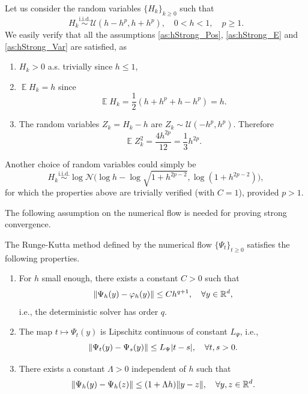 \documentclass{siamart1116}
\numberwithin{theorem}{section}
\DeclarePairedDelimiter{\abs}{\lvert}{\rvert}
\DeclarePairedDelimiter{\norm}{\|}{\|}
\renewcommand{\phi}{\varphi}
\newcommand{\iid}{\ensuremath{\stackrel{\text{i.i.d.}}{\sim}}}
\newcommand{\R}{\mathbb{R}}
\newcommand{\E}{\operatorname{\mathbb{E}}}
\newcommand{\corr}[1]{{\color{bordeaux}#1}}
\begin{document}
\begin{example}\label{ex:uniformH} Let us consider the random variables $\{H_k\}_{k\geq 0}$ such that
	\begin{equation}
		H_k \iid \mathcal{U}(h-h^p, h+h^p), \quad 0 < h < 1, \quad p \geq 1.
	\end{equation}
	We easily verify that all the assumptions \ref{as:hStrong_Pos}, \ref{as:hStrong_E} and \ref{as:hStrong_Var} are satisfied, as 
	\begin{enumerate}
		\item $H_k > 0$ a.s. trivially since $h \leq 1$,
		\item $\E H_k = h$ since 
		\begin{equation}
			\E H_k = \frac{1}{2}(h + h^p + h - h^p) = h.
		\end{equation}
		\item The random variables $Z_k = H_k - h$ are $Z_k \sim \mathcal{U}(-h^p, h^p)$. Therefore
		\begin{equation}
			\E Z_k^2 = \frac{4h^{2p}}{12} = \frac{1}{3}h^{2p}.
		\end{equation}
	\end{enumerate}
	Another choice of random variables could simply be 
	\begin{equation}
		H_k \iid \log\mathcal{N}\big(\log h - \log\sqrt{1 + h^{2p - 2}}, \log(1 + h^{2p-2})\big),
	\end{equation}
	for which the properties above are trivially verified (with $C = 1$), provided $p > 1$.
\end{example}
The following assumption on the numerical flow is needed for proving strong convergence.
\begin{assumption}\label{as:PsiStrong} The Runge-Kutta method defined by the numerical flow $\{\Psi_t\}_{t\geq 0}$ satisfies the following properties.
	\begin{enumerate}
		\item\label{as:PsiStrong_Order} For $h$ small enough, there exists a constant $C > 0$ such that
			\begin{equation}
				\norm{\Psi_h(y) - \phi_h(y)} \leq Ch^{q+1}, \quad \forall y \in \R^d,
			\end{equation}
			\corr{i.e., the deterministic solver has order $q$.}
		\item\label{as:PsiStrong_Time} \corr{The map $t \mapsto \Psi_t(y)$ is Lipschitz continuous of constant $L_\Psi$, i.e.,}
			\begin{equation}\label{eq:LipschitzPsiT}
				\norm{\Psi_t(y) - \Psi_s(y)} \leq L_\Psi \abs{t - s}, \quad \forall t, s > 0.
			\end{equation}
		\item\label{as:PsiStrong_Space} There exists a constant $\Lambda > 0$ independent of $h$ such that 
			\begin{equation}\label{eq:LipschitzPsiY}
				\norm{\Psi_h(y) - \Psi_h(z)} \leq (1 + \Lambda h) \norm{y - z}, \quad \forall y, z \in \R^d.
			\end{equation}
	\end{enumerate}
\end{assumption}
\end{document}
